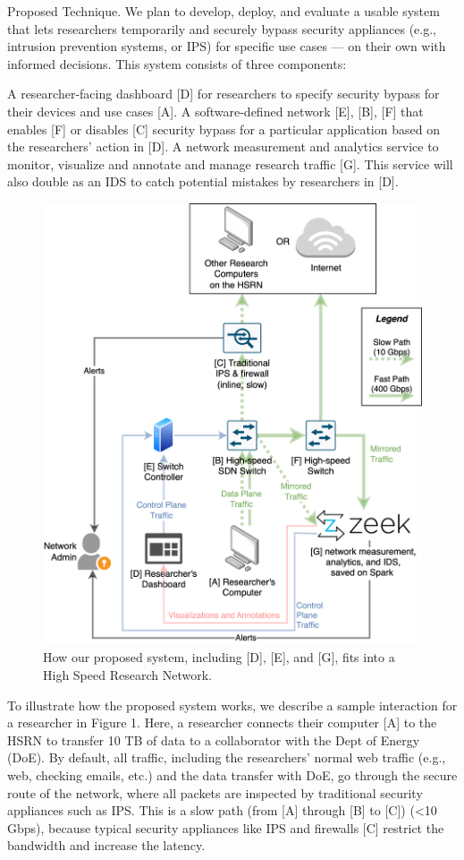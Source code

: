 Proposed Technique. We plan to develop, deploy, and evaluate a usable system that lets researchers temporarily and securely bypass security appliances (e.g., intrusion prevention systems, or IPS) for specific use cases — on their own with informed decisions. This system consists of three components:

A researcher-facing dashboard [D] for researchers to specify security bypass for their devices and use cases [A].
A software-defined network [E], [B], [F] that enables [F] or disables [C] security bypass for a particular application based on the researchers' action in [D].
A network measurement and analytics service to monitor, visualize and annotate and manage research traffic [G]. This service will also double as an IDS to catch potential mistakes by researchers in [D].

\begin{figure}[t]
    \centering
    \includegraphics[width=0.5\linewidth]{figures/system.png}
    \caption{How our proposed system, including [D], [E], and [G], fits into a High Speed Research Network.}
    \label{fig:system}
\end{figure}

To illustrate how the proposed system works, we describe a sample interaction for a researcher in Figure 1. Here, a researcher connects their computer [A] to the HSRN to transfer 10 TB of data to a collaborator with the Dept of Energy (DoE). By default, all traffic, including the researchers' normal web traffic (e.g., web, checking emails, etc.) and the data transfer with DoE, go through the secure route of the network, where all packets are inspected by traditional security appliances such as IPS. This is a slow path (from [A] through [B] to [C]) (<10 Gbps), because  typical security appliances like IPS and firewalls [C] restrict the bandwidth and increase the latency.

